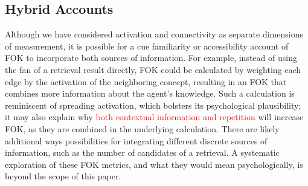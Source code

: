 \documentclass[10pt,letterpaper]{article}
\newcommand{\fixme}[2][]{#2}
\renewcommand{\fixme}[2][]{\textcolor{red}{#2}}
\newcommand{\textcite}[1]{\citeauthor{#1} \citeyear{#1}}
\begin{document}
% 

\subsection{Hybrid Accounts}

Although we have considered activation and connectivity as separate dimensions of measurement, it is possible for a cue familiarity or accessibility account of FOK to incorporate both sources of information.
For example, instead of using the fan of a retrieval result directly, FOK could be calculated by weighting each edge by the activation of the neighboring concept, resulting in an FOK that combines more information about the agent's knowledge.
Such a calculation is reminiscent of spreading activation, which bolsters its psychological plausibility; it may also explain why \fixme[citations?]{both contextual information and repetition} will increase FOK, as they are combined in the underlying calculation.
There are likely additional ways possibilities for integrating different discrete sources of information, such as the number of candidates of a retrieval.
A systematic exploration of these FOK metrics, and what they would mean psychologically, is beyond the scope of this paper.
\end{document}

